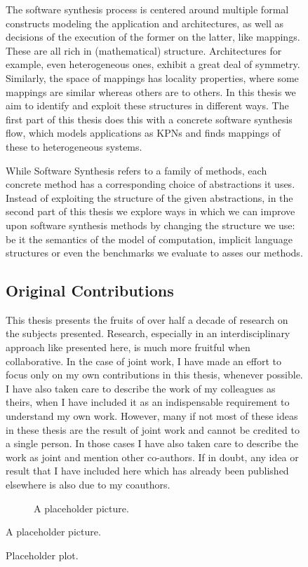 \begin{figure}[h]
The software synthesis process is centered around multiple formal constructs modeling the application and architectures, as well as decisions of the execution of the former on the latter, like mappings.
These are all rich in (mathematical) structure. Architectures for example, even heterogeneous ones, exhibit a great deal of symmetry. Similarly, the space of mappings has locality properties, where some mappings are similar whereas others are to others. In this thesis we aim to identify and exploit these structures in different ways. The first part of this thesis does this with a concrete software synthesis flow, which models applications as \acp{KPN} and finds mappings of these to heterogeneous systems.

While Software Synthesis refers to a family of methods, each concrete method has a corresponding choice of abstractions it uses. Instead of exploiting the structure of the given abstractions, in the second part of this thesis we explore ways in which we can improve upon software synthesis methods by changing the structure we use: be it the semantics of the model of computation, implicit language structures or even the benchmarks we evaluate to asses our methods.

\subsection*{Original Contributions}
This thesis presents the fruits of over half a decade of research on the subjects presented. Research, especially in an interdisciplinary approach like presented here, is much more fruitful when collaborative.
In the case of joint work, I have made an effort to focus only on my own contributions in this thesis, whenever possible.
I have also taken care to describe the work of my colleagues as theirs, when I have included it as an indispensable requirement to understand my own work.
However,  many if not most of these ideas in these thesis are the result of joint work and cannot be credited to a single person.
In those cases I have also taken care to describe the work as joint and mention other co-authors.
If in doubt, any idea or result that I have included here which has already been published elsewhere is also due to my coauthors.

\begin{figure}[h]
	\centering
   \resizebox{0.55\textwidth}{!}{}
	\caption{A placeholder picture.}
	\label{fig:placeholder}
\end{figure}

\end{figure}
\begin{figure}[h]
	\centering
   \resizebox{0.55\textwidth}{!}{}
	\caption{Placeholder plot.} %
	\label{fig:placeholder_plot}
\end{figure}

